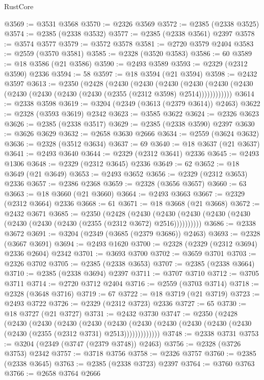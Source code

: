\begin{lexlean}{RustCore}
\begin{coremodule}
@3569 := @3531 @3568
@3570 := @2326 @3569
@3572 := @2385 (@2338 @3525)
@3574 := @2385 (@2338 @3532)
@3577 := @2385 (@2338 @3561) @2397
@3578 := @3574 @3577
@3579 := @3572 @3578
@3581 := @2720 @3579 @2404
@3583 := @2559 (@3570 @3581)
@3585 := @2328 (@3520 @3583)
@3586 := 60
@3589 := @18 @3586 (@21 @3586)
@3590 := @2493 @3589
@3593 := @2329 (@2312 @3590) @2336
@3594 := 58
@3597 := @18 @3594 (@21 @3594)
@3598 := @2432 @3597
@3613 := @2350
    (@2428
      (@2430
        (@2430
          (@2430
            (@2430 (@2430 (@2430 (@2430 (@2430 (@2430 (@2430 (@2355 (@2312 @3598) @2514))))))))))))
@3614 := @2338 @3598
@3619 := @3204 (@2349 (@3613 (@2379 @3614)) @2463)
@3622 := @2328 (@3593 @3619) @2342
@3623 := @3585 @3622
@3624 := @2326 @3623
@3626 := @2385 (@2338 @3517)
@3629 := @2385 (@2338 @3590) @2397
@3630 := @3626 @3629
@3632 := @2658 @3630 @2666
@3634 := @2559 (@3624 @3632)
@3636 := @2328 (@3512 @3634)
@3637 := 69
@3640 := @18 @3637 (@21 @3637)
@3641 := @2493 @3640
@3644 := @2329 (@2312 @3641) @2336
@3645 := @2493 @1306
@3648 := @2329 (@2312 @3645) @2336
@3649 := 62
@3652 := @18 @3649 (@21 @3649)
@3653 := @2493 @3652
@3656 := @2329 (@2312 @3653) @2336
@3657 := @2386 @2368
@3659 := @2328 (@3656 @3657)
@3660 := 63
@3663 := @18 @3660 (@21 @3660)
@3664 := @2493 @3663
@3667 := @2329 (@2312 @3664) @2336
@3668 := 61
@3671 := @18 @3668 (@21 @3668)
@3672 := @2432 @3671
@3685 := @2350
    (@2428
      (@2430 (@2430 (@2430 (@2430 (@2430 (@2430 (@2430 (@2430 (@2355 (@2312 @3672) @2516))))))))))
@3686 := @2338 @3672
@3691 := @3204 (@2349 (@3685 (@2379 @3686)) @2463)
@3693 := @2328 (@3667 @3691)
@3694 := @2493 @1620
@3700 := @2328 (@2329 (@2312 @3694) @2336 @2604) @2342
@3701 := @3693 @3700
@3702 := @3659 @3701
@3703 := @2326 @3702
@3705 := @2385 (@2338 @3653)
@3707 := @2385 (@2338 @3664)
@3710 := @2385 (@2338 @3694) @2397
@3711 := @3707 @3710
@3712 := @3705 @3711
@3714 := @2720 @3712 @2404
@3716 := @2559 (@3703 @3714)
@3718 := @2328 (@3648 @3716)
@3719 := 67
@3722 := @18 @3719 (@21 @3719)
@3723 := @2493 @3722
@3726 := @2329 (@2312 @3723) @2336
@3727 := 65
@3730 := @18 @3727 (@21 @3727)
@3731 := @2432 @3730
@3747 := @2350
    (@2428
      (@2430
        (@2430
          (@2430
            (@2430
              (@2430
                (@2430 (@2430 (@2430 (@2430 (@2430 (@2430 (@2355 (@2312 @3731) @2513)))))))))))))
@3748 := @2338 @3731
@3753 := @3204 (@2349 (@3747 (@2379 @3748)) @2463)
@3756 := @2328 (@3726 @3753) @2342
@3757 := @3718 @3756
@3758 := @2326 @3757
@3760 := @2385 (@2338 @3645)
@3763 := @2385 (@2338 @3723) @2397
@3764 := @3760 @3763
@3766 := @2658 @3764 @2666

\end{coremodule}
\end{lexlean}
